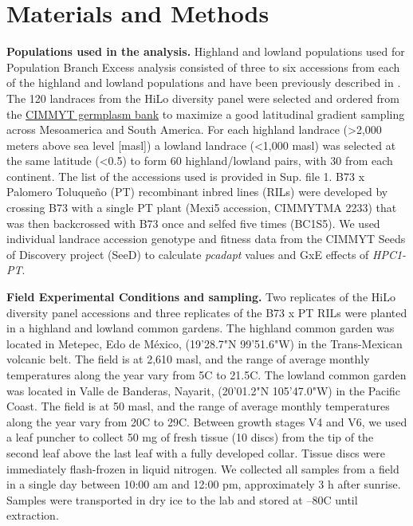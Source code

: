 \documentclass[9pt,twocolumn,twoside,lineno]{biorxiv}
\begin{document}
\section{Materials and Methods}
\label{sec:materials:methods}
\textbf{Populations used in the analysis.} 
Highland and lowland populations used for Population Branch Excess analysis consisted of three to six accessions from each of the highland and lowland populations and have been previously described in \cite{Wang2020-mp, Wang2017-bc}. 
The 120 landraces from the HiLo diversity panel were selected and ordered from the \href{http://mgb.cimmyt.org/gringlobal/search.aspx}{CIMMYT germplasm bank} to maximize a good latitudinal gradient sampling across Mesoamerica and South America. 
For each highland landrace (>2,000 meters above sea level [masl]) a lowland landrace (<1,000 masl) was selected at the same latitude (<0.5\degree) to form 60 highland/lowland pairs, with 30 from each continent. 
The list of the accessions used is provided in Sup. file 1.   
B73 x Palomero Toluqueño (PT) recombinant inbred lines (RILs) were developed by crossing B73 with a single PT plant (Mexi5 accession, CIMMYTMA 2233) that was then backcrossed with B73 once and selfed five times (BC1S5).  
We used  individual landrace accession genotype and fitness data from the CIMMYT Seeds of Discovery project (SeeD) \cite{Gates2019-xu} to calculate \textit{pcadapt} \cite{Luu2017-ws} values and GxE effects of \textit{HPC1-PT}.

\textbf{Field Experimental Conditions and sampling.} 
Two replicates of the HiLo diversity panel accessions and three replicates of the B73 x PT RILs were planted in a highland and lowland common gardens. 
The highland common garden was located in Metepec, Edo de M\'exico, (19'28.7"N 99'51.6"W) in the Trans-Mexican volcanic belt. 
The field is at 2,610 masl, and the range of average monthly temperatures along the year vary from 5\degree C to 21.5\degree C.  
The lowland common garden was located in Valle de Banderas, Nayarit, (20'01.2"N 105'47.0"W) in the Pacific Coast. 
The field is at 50 masl, and the range of average monthly temperatures along the year vary from 20\degree C to 29\degree C.
Between growth stages V4 and V6, we used a leaf puncher to collect 50 mg of fresh tissue (10 discs) from the tip of the second leaf above the last leaf with a fully developed collar. 
Tissue discs were immediately flash-frozen in liquid nitrogen. 
We collected all samples from a field in a single day between 10:00 am and 12:00 pm, approximately 3 h after sunrise.
Samples were transported in dry ice to the lab and stored at --80\degree C until extraction. 
\end{document}

